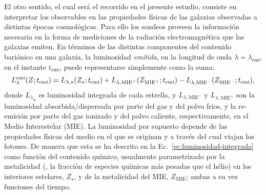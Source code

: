 El otro sentido, el cual será el recorrido en el presente estudio, consiste en interpretar los
observables en las propiedades físicas de las galaxias observadas a distintas épocas cosmológicas.
Para ello los sondeos proveen la información necesaria en la forma de mediciones de la radiación
electromagnética que las galaxias emiten. En términos de las distintas componentes del contenido
bariónico en una galaxia, la luminosidad \emph{emitida}, en la longitud de onda
$\lambda=\lambda_\text{emi}$, en el instante $t_\text{emi}$, puede representarse simplemente como la
suma:
%
\begin{equation}\label{ec:luminosidad-integrada}
{L}_\lambda^\text{emi}(Z;t_\text{emi}) = L_{\lambda,\star}(Z_\star;t_\text{emi}) +
                             L_{\lambda,\text{MIE}^+}(Z_{\text{MIE}^+};t_\text{emi}) -
                             L_{\lambda,\text{MIE}^-}(Z_{\text{MIE}^-};t_\text{emi}),
\end{equation}
%
donde ${L_\lambda}_\star$ es luminosidad integrada de cada estrella, y $L_{\lambda,\text{MIE}^-}$ y
$L_{\lambda,\text{MIE}^+}$ son la luminosidad absorbida/dispersada por parte del gas y del polvo
fríos, y la re-emisión por parte del gas ionizado y del polvo caliente, respectivamente, en el Medio
Interestelar (MIE). La luminosidad por supuesto depende de las propiedades físicas del medio en el
que se originan y a través del cual viajan los fotones. De manera que esta se ha descrito en la
Ec.~\eqref{ec:luminosidad-integrada} como función del contenido químico, usualmente parametrizado
por la metalicidad (\ie, la fracción de especies químicas más pesadas que el hélio) en los
interiores estelares, $Z_\star$, y de la metalicidad del MIE, $Z_\text{MIE}$; ambas a su vez
funciones del tiempo.


